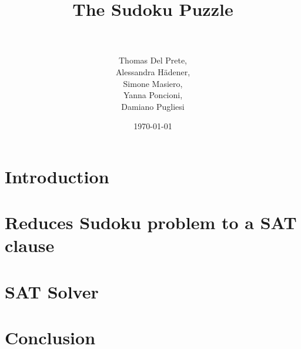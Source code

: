 \documentclass[paper=a4, fontsize=12pt]{scrartcl} %
\title{	
\huge The Sudoku Puzzle \\ %
\horrule{0.5pt} \\[0.5cm] %
}
\author{Thomas Del Prete, \\
		Alessandra H{\" a}dener, \\
		Simone Masiero, \\
		Yanna Poncioni, \\
		Damiano Pugliesi} %
\date{\normalsize\today} %
\begin{document}
	
	\maketitle
	
	\section*{Introduction}
		
	\section*{Reduces Sudoku problem to a SAT clause}
	
	\section*{SAT Solver}
	
	\section*{Conclusion}
	
	
\end{document}
